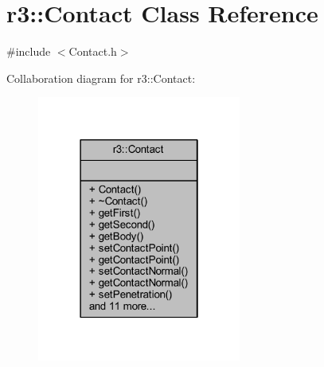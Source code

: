 \hypertarget{classr3_1_1_contact}{}\section{r3\+:\+:Contact Class Reference}
\label{classr3_1_1_contact}


{\ttfamily \#include $<$Contact.\+h$>$}



Collaboration diagram for r3\+:\+:Contact\+:\nopagebreak
\begin{figure}[H]
\begin{center}
\leavevmode
\includegraphics[width=190pt]{classr3_1_1_contact__coll__graph}
\end{center}
\end{figure}
